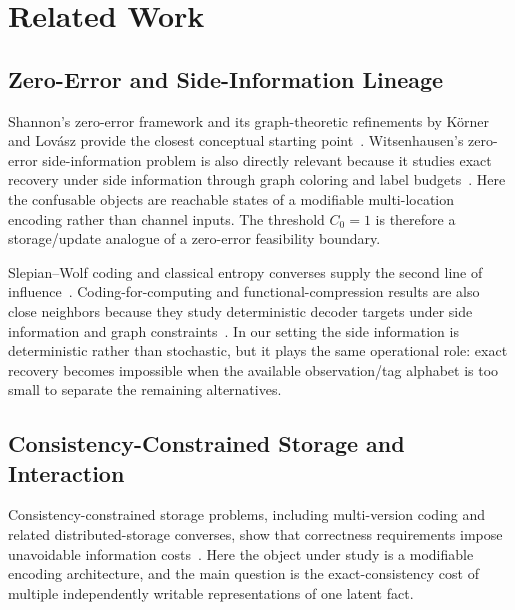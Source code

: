 \section{Related Work}\label{sec:related}

\subsection{Zero-Error and Side-Information Lineage}\label{sec:related-source-coding}

Shannon's zero-error framework and its graph-theoretic refinements by Körner and Lovász provide the closest conceptual starting point~\cite{shannon1956zero,korner1973graphs,lovasz1979shannon}. Witsenhausen's zero-error side-information problem is also directly relevant because it studies exact recovery under side information through graph coloring and label budgets~\cite{witsenhausen1976zero}. Here the confusable objects are reachable states of a modifiable multi-location encoding rather than channel inputs. The threshold $C_0=1$ is therefore a storage/update analogue of a zero-error feasibility boundary.

Slepian--Wolf coding and classical entropy converses supply the second line of influence~\cite{slepian1973noiseless,fano1961transmission,witsenhausen1975conditional,cover2006elements}. Coding-for-computing and functional-compression results are also close neighbors because they study deterministic decoder targets under side information and graph constraints~\cite{orlitsky2001coding,doshi2010functional}. In our setting the side information is deterministic rather than stochastic, but it plays the same operational role: exact recovery becomes impossible when the available observation/tag alphabet is too small to separate the remaining alternatives.

\subsection{Consistency-Constrained Storage and Interaction}\label{sec:related-distributed}

Consistency-constrained storage problems, including multi-version coding and related distributed-storage converses, show that correctness requirements impose unavoidable information costs~\cite{rashmi2015multiversion}. Here the object under study is a modifiable encoding architecture, and the main question is the exact-consistency cost of multiple independently writable representations of one latent fact.

